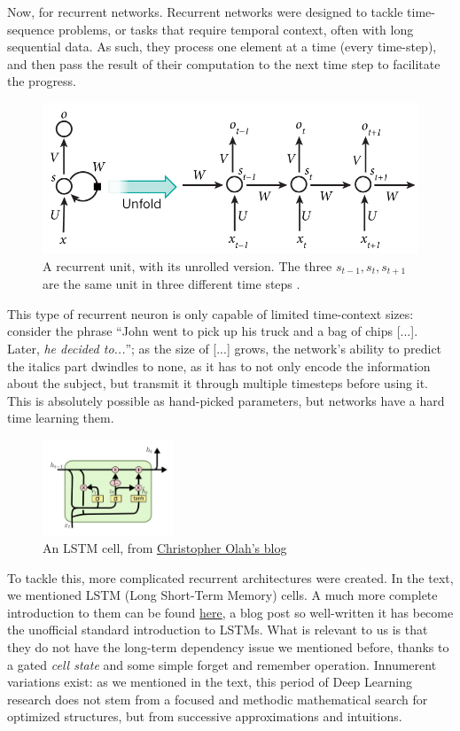 \documentclass[../main.tex]{subfiles}
\begin{document}
Now, for recurrent networks. Recurrent networks were designed to tackle time-sequence problems, or tasks that require temporal context, often with long sequential data. As such, they process one element at a time (every time-step), and then pass the result of their computation to the next time step to facilitate the progress.
\begin{figure}[h]
    \caption{A recurrent unit, with its unrolled version. The three $s_{t-1}, s_t, s_{t+1}$ are the same unit in three different time steps \parencite{lecunDeepLearning2015}. }
    \includegraphics[width=\textwidth]{img/RNN.png}
\end{figure}
This type of recurrent neuron is only capable of limited time-context sizes: consider the phrase ``John went to pick up his truck and a bag of chips [...]. Later, \textit{he decided to...}''; as the size of [...] grows, the network's ability to predict the italics part dwindles to none, as it has to not only encode the information about the subject, but transmit it through multiple timesteps before using it. This is absolutely possible as hand-picked parameters, but networks have a hard time learning them.
\vspace{4pt}
\begin{figure}
    \centering
    \caption{An LSTM cell, from \href{http://colah.github.io/posts/2015-08-Understanding-LSTMs/}{Christopher Olah's blog} }
    \includegraphics[width=0.35\textwidth]{img/LSTM.png}
\end{figure}

To tackle this, more complicated recurrent architectures were created. In the text, we mentioned LSTM (Long Short-Term Memory) cells. A much more complete introduction to them can be found \href{http://colah.github.io/posts/2015-08-Understanding-LSTMs/}{here}, a blog post so well-written it has become the unofficial standard introduction to LSTMs. What is relevant to us is that they do not have the long-term dependency issue we mentioned before, thanks to a gated \textit{cell state} and some simple forget and remember operation. Innumerent variations exist: as we mentioned in the text, this period of Deep Learning research does not stem from a focused and methodic mathematical search for optimized structures, but from successive approximations and intuitions.
\end{document}
